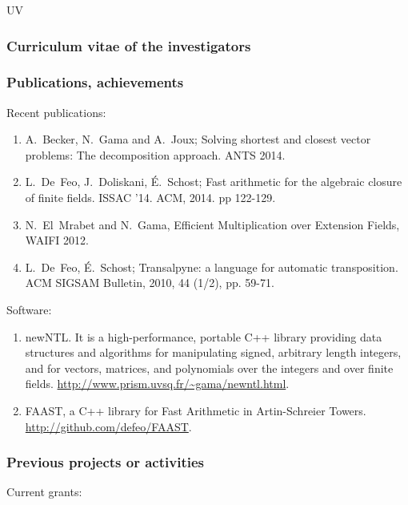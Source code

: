 \begin{sitedescription}{UV}
\subsubsection*{Curriculum vitae of the investigators}




\subsubsection*{Publications, achievements}

Recent publications:

\begin{enumerate}
\item A.~Becker, N.~Gama and A.~Joux; Solving shortest and closest
  vector problems: The decomposition approach. ANTS 2014.
\item L.~De~Feo, J.~Doliskani, É.~Schost; Fast arithmetic for the
  algebraic closure of finite fields. ISSAC '14. ACM, 2014. pp
  122-129.
\item N.~El~Mrabet and N.~Gama, Efficient Multiplication over
  Extension Fields, WAIFI 2012.
\item L.~De~Feo, É.~Schost; Transalpyne: a language for automatic
  transposition. ACM SIGSAM Bulletin, 2010, 44 (1/2), pp. 59-71.
\end{enumerate}

Software:

\begin{enumerate}
\item newNTL. It is a high-performance, portable C++ library providing
  data structures and algorithms for manipulating signed, arbitrary
  length integers, and for vectors, matrices, and polynomials over the
  integers and over finite
  fields. \url{http://www.prism.uvsq.fr/~gama/newntl.html}.
\item FAAST, a C++ library for Fast Arithmetic in Artin-Schreier
  Towers. \url{http://github.com/defeo/FAAST}.
\end{enumerate}

\subsubsection*{Previous projects or activities}

Current grants:


\end{sitedescription}
